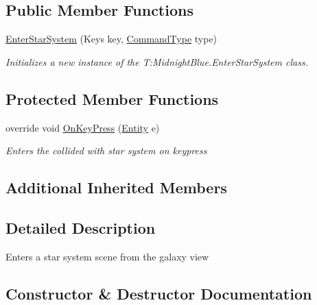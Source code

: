 \subsection*{Public Member Functions}
\begin{DoxyCompactItemize}
\item 
\hyperlink{class_midnight_blue_1_1_enter_star_system_a6bea0a7daba691c1b46238114b347377}{Enter\+Star\+System} (Keys key, \hyperlink{namespace_m_b2_d_1_1_i_o_ab5f95f3fe9e652778b62bdf943168a68}{Command\+Type} type)
\begin{DoxyCompactList}\small\item\em Initializes a new instance of the T\+:\+Midnight\+Blue.\+Enter\+Star\+System class. \end{DoxyCompactList}\end{DoxyCompactItemize}
\subsection*{Protected Member Functions}
\begin{DoxyCompactItemize}
\item 
override void \hyperlink{class_midnight_blue_1_1_enter_star_system_a1cf84a93760ef0cda918915ec8acfa4d}{On\+Key\+Press} (\hyperlink{class_m_b2_d_1_1_entity_component_1_1_entity}{Entity} e)
\begin{DoxyCompactList}\small\item\em Enters the collided with star system on keypress \end{DoxyCompactList}\end{DoxyCompactItemize}
\subsection*{Additional Inherited Members}


\subsection{Detailed Description}
Enters a star system scene from the galaxy view 



\subsection{Constructor \& Destructor Documentation}
\hypertarget{class_midnight_blue_1_1_enter_star_system_a6bea0a7daba691c1b46238114b347377}{}\label{class_midnight_blue_1_1_enter_star_system_a6bea0a7daba691c1b46238114b347377} 
